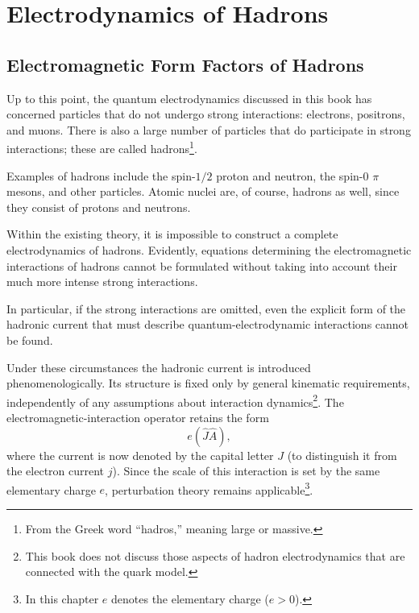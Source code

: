 \setcounter{chapter}{13}
\chapter{Electrodynamics of Hadrons}
\setcounter{section}{137}
\section{Electromagnetic Form Factors of Hadrons}

Up to this point, the quantum electrodynamics discussed in this book has concerned particles that do not undergo strong interactions: electrons, positrons, and muons. There is also a large number of particles that do participate in strong interactions; these are called hadrons\footnote{From the Greek word ``hadros,'' meaning large or massive.}.

Examples of hadrons include the spin-$1/2$ proton and neutron, the spin-0 $\pi$ mesons, and other particles. Atomic nuclei are, of course, hadrons as well, since they consist of protons and neutrons.

Within the existing theory, it is impossible to construct a complete electrodynamics of hadrons. Evidently, equations determining the electromagnetic interactions of hadrons cannot be formulated without taking into account their much more intense strong interactions.

In particular, if the strong interactions are omitted, even the explicit form of the hadronic current that must describe quantum-electrodynamic interactions cannot be found.

Under these circumstances the hadronic current is introduced phenomenologically. Its structure is fixed only by general kinematic requirements, independently of any assumptions about interaction dynamics\footnote{This book does not discuss those aspects of hadron electrodynamics that are connected with the quark model.}. The electromagnetic-interaction operator retains the form
\begin{equation}
e(\widehat J\widehat A),
\tag{138.1}
\end{equation}
where the current is now denoted by the capital letter $J$ (to distinguish it from the electron current $j$). Since the scale of this interaction is set by the same elementary charge $e$, perturbation theory remains applicable\footnote{In this chapter $e$ denotes the elementary charge ($e>0$).}.

